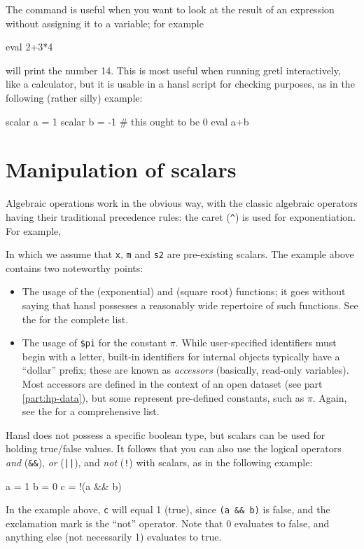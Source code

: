 The  command is useful when you want to look at the result
of an expression without assigning it to a variable; for example
\begin{code}
  eval 2+3*4
\end{code}
will print the number 14. This is most useful when running gretl
interactively, like a calculator, but it is usable in a hansl script
for checking purposes, as in the following (rather silly) example:
\begin{code}
  scalar a = 1
  scalar b = -1
  # this ought to be 0
  eval a+b
\end{code}

\section{Manipulation of scalars}

Algebraic operations work in the obvious way, with the classic
algebraic operators having their traditional precedence rules: the
caret (\verb|^|) is used for exponentiation. For example,
In which we assume that \texttt{x}, \texttt{m} and \texttt{s2} are
pre-existing scalars. The example above contains two noteworthy
points:
\begin{itemize}
\item The usage of the  (exponential) and  (square
  root) functions; it goes without saying that hansl possesses a
  reasonably wide repertoire of such functions. See the \GCR{} for the
  complete list.
\item The usage of \verb|$pi| for the constant $\pi$. While
  user-specified identifiers must begin with a letter, built-in
  identifiers for internal objects typically have a ``dollar'' prefix;
  these are known as \emph{accessors} (basically, read-only
  variables).  Most accessors are defined in the context of an open
  dataset (see part \ref{part:hp-data}), but some represent
  pre-defined constants, such as $\pi$. Again, see the \GCR{} for a
  comprehensive list.
\end{itemize}

Hansl does not possess a specific boolean type, but scalars can be
used for holding true/false values. It follows that you can also use
the logical operators \emph{and} (\verb|&&|), \emph{or} (\verb+||+),
and \emph{not} (\verb|!|) with scalars, as in the following example:
\begin{code}
  a = 1
  b = 0
  c = !(a && b) 
\end{code}
In the example above, \texttt{c} will equal 1 (true), since
\verb|(a && b)| is false, and the exclamation mark is the ``not''
operator.  Note that 0 evaluates to false, and anything else (not
necessarily 1) evaluates to true.

